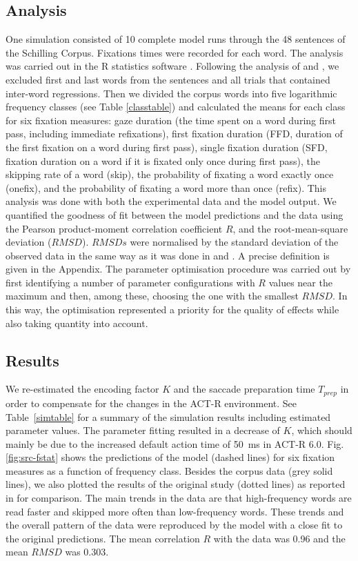 \documentclass{cambridge7A}\usepackage[]{graphicx}\usepackage[]{color}
\begin{document}
\subsection{Analysis}
One simulation consisted of 10 complete model runs through the 48 sentences of the Schilling Corpus.  Fixations times were recorded for each word.  The analysis was carried out in the R{} statistics software \cite{R2012}.  Following the analysis of \cite{Reichle1998} and \cite{Salvucci2001}, we excluded first and last words from the sentences and all trials that contained inter-word regressions. Then we divided the corpus words into five logarithmic frequency classes (see Table \ref{classtable}) and calculated the means for each class for six fixation measures: gaze duration (the time spent on a word during first pass, including immediate refixations), first fixation duration (FFD, duration of the first fixation on a word during first pass), single fixation duration (SFD, fixation duration on a word if it is fixated only once during first pass), the skipping rate of a word (skip), the probability of fixating a word exactly once (onefix), and the probability of fixating a word more than once (refix).  This analysis was done with both the experimental data and the model output.
We quantified the goodness of fit between the model predictions and the data using the  Pearson product-moment correlation coefficient $R$, and the  root-mean-square deviation ($RMSD$).  $RMSDs$ were normalised by the standard deviation of the observed data in the same way as it was done in \cite{Reichle1998} and \cite{Salvucci2001}.  A precise definition is given in the Appendix.
The parameter optimisation procedure was carried out by first identifying a number of parameter configurations with $R$ values near the maximum and then, among these, choosing the one with the smallest $RMSD$.  In this way, the optimisation represented a priority for the quality of effects while also taking quantity into account.

\subsection{Results}
We re-estimated the encoding factor $K$ and the saccade preparation time $T_{prep}$ in order to compensate for the changes in the ACT-R environment.  See Table~\ref{simtable} for a summary of the simulation results including estimated parameter values.  
The parameter fitting resulted in a decrease of $K$, which should mainly be due to the increased default action time of 50~ms in ACT-R 6.0.
Fig. \ref{fig:src-fstat} shows the predictions of the model (dashed lines) for six fixation measures as a function of frequency class.  Besides the corpus data (grey solid lines), we also plotted the results of the original study (dotted lines) as reported in \cite{Salvucci2001} for comparison.
The main trends in the data are that high-frequency words are read faster and skipped more often than low-frequency words. These trends and the overall pattern of the data were reproduced by the model with a close fit to the original predictions. The mean correlation $R$ with the data was 0.96 and the mean $RMSD$ was 0.303.
\end{document}
